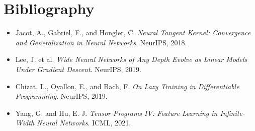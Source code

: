 \documentclass[11pt,a4paper,oneside,openany]{memoir}
\theoremstyle{definition}
\begin{document}
\chapter*{Bibliography}
\begin{itemize}
\item Jacot, A., Gabriel, F., and Hongler, C. \emph{Neural Tangent Kernel: Convergence and Generalization in Neural Networks}. NeurIPS, 2018.
\item Lee, J. et al. \emph{Wide Neural Networks of Any Depth Evolve as Linear Models Under Gradient Descent}. NeurIPS, 2019.
\item Chizat, L., Oyallon, E., and Bach, F. \emph{On Lazy Training in Differentiable Programming}. NeurIPS, 2019.
\item Yang, G. and Hu, E. J. \emph{Tensor Programs IV: Feature Learning in Infinite-Width Neural Networks}. ICML, 2021.
\end{itemize}
\end{document}
